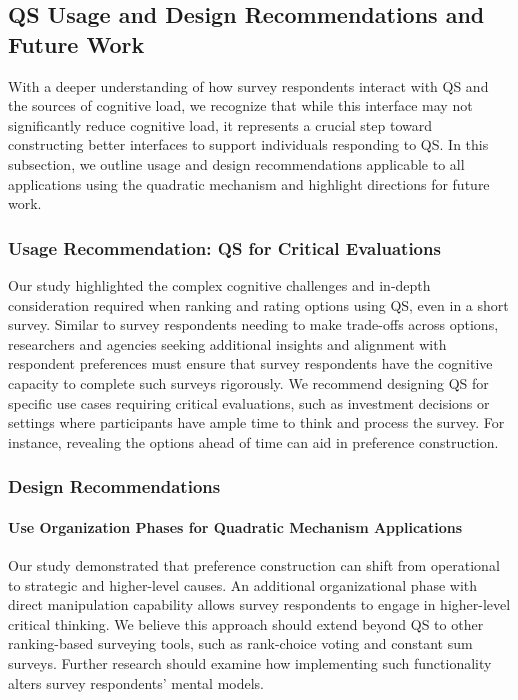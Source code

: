 \subsection{QS Usage and Design Recommendations and Future Work}
With a deeper understanding of how survey respondents interact with QS and the sources of cognitive load, we recognize that while this interface may not significantly reduce cognitive load, it represents a crucial step toward constructing better interfaces to support individuals responding to QS. In this subsection, we outline usage and design recommendations applicable to all applications using the quadratic mechanism and highlight directions for future work.

\subsubsection{Usage Recommendation: QS for Critical Evaluations}
Our study highlighted the complex cognitive challenges and in-depth consideration required when ranking and rating options using QS, even in a short survey. Similar to survey respondents needing to make trade-offs across options, researchers and agencies seeking additional insights and alignment with respondent preferences must ensure that survey respondents have the cognitive capacity to complete such surveys rigorously. We recommend designing QS for specific use cases requiring critical evaluations, such as investment decisions or settings where participants have ample time to think and process the survey. For instance, revealing the options ahead of time can aid in preference construction.

\subsubsection{Design Recommendations}
\paragraph{Use Organization Phases for Quadratic Mechanism Applications}
Our study demonstrated that preference construction can shift from operational to strategic and higher-level causes. An additional organizational phase with direct manipulation capability allows survey respondents to engage in higher-level critical thinking. We believe this approach should extend beyond QS to other ranking-based surveying tools, such as rank-choice voting and constant sum surveys. Further research should examine how implementing such functionality alters survey respondents' mental models.

